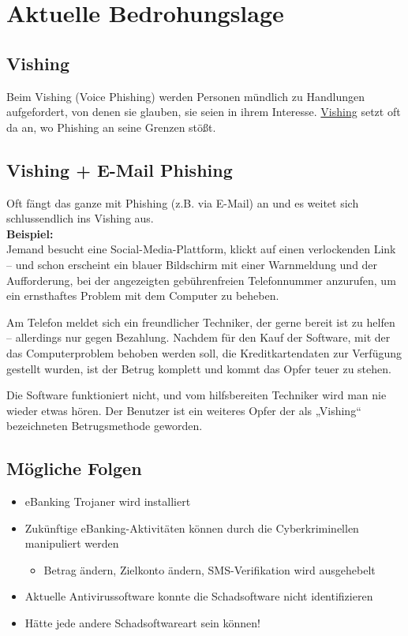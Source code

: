 
\section{Aktuelle Bedrohungslage}

\subsection{Vishing}
Beim Vishing (Voice Phishing) werden Personen mündlich zu Handlungen aufgefordert, von denen sie glauben, sie seien in ihrem Interesse. \href{https://www.kaspersky.de/resource-center/definitions/vishing}{Vishing} setzt oft da an, wo Phishing an seine Grenzen stößt.

\subsection{Vishing + E-Mail Phishing}

Oft fängt das ganze mit Phishing (z.B. via E-Mail) an und es weitet sich schlussendlich ins Vishing aus.\\

\textbf{Beispiel:}\\
Jemand besucht eine Social-Media-Plattform, klickt auf einen verlockenden Link – und schon erscheint ein blauer Bildschirm mit einer Warnmeldung und der Aufforderung, bei der angezeigten gebührenfreien Telefonnummer anzurufen, um ein ernsthaftes Problem mit dem Computer zu beheben.

Am Telefon meldet sich ein freundlicher Techniker, der gerne bereit ist zu helfen – allerdings nur gegen Bezahlung. Nachdem für den Kauf der Software, mit der das Computerproblem behoben werden soll, die Kreditkartendaten zur Verfügung gestellt wurden, ist der Betrug komplett und kommt das Opfer teuer zu stehen.

Die Software funktioniert nicht, und vom hilfsbereiten Techniker wird man nie wieder etwas hören. Der Benutzer ist ein weiteres Opfer der als „Vishing“ bezeichneten Betrugsmethode geworden.

\subsection{Mögliche Folgen}
\begin{itemize}
    \item eBanking Trojaner wird installiert
    \item Zukünftige eBanking-Aktivitäten können durch die Cyberkriminellen manipuliert werden
    \begin{itemize}
        \item Betrag ändern, Zielkonto ändern, SMS-Verifikation wird ausgehebelt
    \end{itemize}
    \item Aktuelle Antivirussoftware konnte die Schadsoftware nicht identifizieren
    \item Hätte jede andere Schadsoftwareart sein können!
\end{itemize}

